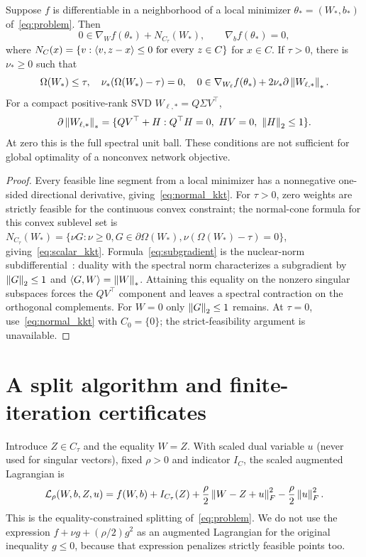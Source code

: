 \begin{proposition}\label{prop:kkt}
Suppose $f$ is differentiable in a neighborhood of a local minimizer $\theta_*=(W_*,b_*)$ of~\eqref{eq:problem}. Then
\begin{equation}\label{eq:normal_kkt}
 0\in\nabla_W f(\theta_*)+N_{C_\tau}(W_*),\qquad \nabla_b f(\theta_*)=0,
\end{equation}
where $N_C(x)=\{v:\left\langle v,z-x\right\rangle\le0\text{ for every }z\in C\}$ for $x\in C$. If $\tau>0$, there is $\nu_*\ge0$ such that
\begin{equation}\label{eq:scalar_kkt}
 \Omega(W_*)\le\tau,\quad \nu_*(\Omega(W_*)-\tau)=0,\quad
 0\in\nabla_{W_\ell}f(\theta_*)+2\nu_*\partial\left\lVert W_{\ell,*}\right\rVert_*.
\end{equation}
For a compact positive-rank SVD $W_{\ell,*}=Q\Sigma V^\top$,
\begin{equation}\label{eq:subgradient}
 \partial\left\lVert W_{\ell,*}\right\rVert_*=
 \{QV^\top+H:Q^\top H=0,\ HV=0,\ \left\lVert H\right\rVert_2\le1\}.
\end{equation}
At zero this is the full spectral unit ball. These conditions are not sufficient for global optimality of a nonconvex network objective.
\end{proposition}
\begin{proof}
Every feasible line segment from a local minimizer has a nonnegative one-sided directional derivative, giving~\eqref{eq:normal_kkt}. For $\tau>0$, zero weights are strictly feasible for the continuous convex constraint; the normal-cone formula for this convex sublevel set is $N_{C_\tau}(W_*)=\{\nu G:\nu\ge0,G\in\partial\Omega(W_*),\nu(\Omega(W_*)-\tau)=0\}$, giving~\eqref{eq:scalar_kkt}. Formula~\eqref{eq:subgradient} is the nuclear-norm subdifferential~\cite{Watson1992Subdiff}: duality with the spectral norm characterizes a subgradient by $\left\lVert G\right\rVert_2\le1$ and $\left\langle G,W\right\rangle=\left\lVert W\right\rVert_*$. Attaining this equality on the nonzero singular subspaces forces the $QV^\top$ component and leaves a spectral contraction on the orthogonal complements. For $W=0$ only $\left\lVert G\right\rVert_2\le1$ remains. At $\tau=0$, use~\eqref{eq:normal_kkt} with $C_0=\{0\}$; the strict-feasibility argument is unavailable.
\end{proof}

\section{A split algorithm and finite-iteration certificates}\label{sec:algorithm}
Introduce $Z\in C_\tau$ and the equality $W=Z$. With scaled dual variable $u$ (never used for singular vectors), fixed $\rho>0$ and indicator $I_C$, the scaled augmented Lagrangian is
\begin{equation}\label{eq:augmented}
 \mathcal L_\rho(W,b,Z,u)=f(W,b)+I_{C_\tau}(Z)
 +\frac\rho2\left\lVert W-Z+u\right\rVert_F^2-\frac\rho2\left\lVert u\right\rVert_F^2.
\end{equation}
This is the equality-constrained splitting of~\eqref{eq:problem}. We do not use the expression $f+\nu g+(\rho/2)g^2$ as an augmented Lagrangian for the original inequality $g\le0$, because that expression penalizes strictly feasible points too.

